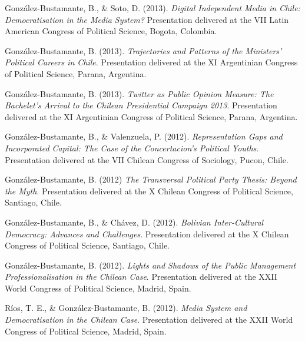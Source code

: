 \begin{publications}
\begin{benumerate}{66}
\item{\small González-Bustamante, B., \& Soto, D. (2013). {\itshape Digital Independent Media in Chile: Democratisation in the Media System?} Presentation delivered at the VII Latin American Congress of Political Science, Bogota, Colombia.}\vspace{1mm}

\item{\small González-Bustamante, B. (2013). {\itshape Trajectories and Patterns of the Ministers' Political Careers in Chile}. Presentation delivered at the XI Argentinian Congress of Political Science, Parana, Argentina.}\vspace{1mm}

\item{\small González-Bustamante, B. (2013). {\itshape Twitter as Public Opinion Measure: The Bachelet's Arrival to the Chilean Presidential Campaign 2013}. Presentation delivered at the XI Argentinian Congress of Political Science, Parana, Argentina.}\vspace{1mm}

\item{\small González-Bustamante, B., \& Valenzuela, P. (2012). {\itshape Representation Gaps and Incorporated Capital: The Case of the Concertacion's Political Youths}. Presentation delivered at the VII Chilean Congress of Sociology, Pucon, Chile.}\vspace{1mm}

\item{\small González-Bustamante, B. (2012) {\itshape The Transversal Political Party Thesis: Beyond the Myth}. Presentation delivered at the X Chilean Congress of Political Science, Santiago, Chile.}\vspace{1mm}

\item{\small González-Bustamante, B., \& Chávez, D. (2012). {\itshape Bolivian Inter-Cultural Democracy: Advances and Challenges}. Presentation delivered at the X Chilean Congress of Political Science, Santiago, Chile.}\vspace{1mm}

\item{\small González-Bustamante, B. (2012). {\itshape Lights and Shadows of the Public Management Professionalisation in the Chilean Case}. Presentation delivered at the XXII World Congress of Political Science, Madrid, Spain.}\vspace{1mm}

\item{\small Ríos, T. E., \& González-Bustamante, B. (2012). {\itshape Media System and Democratisation in the Chilean Case}. Presentation delivered at the XXII World Congress of Political Science, Madrid, Spain.}\vspace{1mm}


\end{benumerate}
\end{publications}
